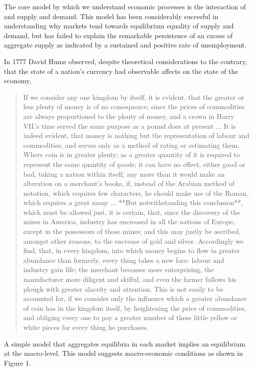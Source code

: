 \documentclass{article}
\begin{document}
The core model by which we understand economic processes is the interaction of and supply and
demand. This model has been considerably succesful in understanding why markets tend towards
equilibrium equality of supply and demand, but has failed to explain the remarkable persistence of
an excess of aggregate supply as indicated by a sustained and positive rate of unemployment.

In 1777 David Hume observed, despite theoretical considerations to the contrary, that the
state of a nation's currency had observable affects on the state of the economy,

\begin{quotation}
If we consider any one kingdom by itself, it is evident, that the greater or less plenty of money
is of no consequence; since the prices of commodities are always proportioned to the plenty of
money, and a crown in Harry VII.’s time served the same purpose as a pound does at present ... It is
indeed evident, that money is nothing but the representation of labour and commodities, and serves
only as a method of rating or estimating them. Where coin is in greater plenty; as a greater
quantity of it is required to represent the same quantity of goods; it can have no effect, either
good or bad, taking a nation within itself; any more than it would make an alteration on a
merchant’s books, if, instead of the Arabian method of notation, which requires few characters, he
should make use of the Roman, which requires a great many ... **But notwithstanding this
conclusion**, which must be allowed just, it is certain, that, since the discovery of the mines in
America, industry has encreased in all the nations of Europe, except in the possessors of those
mines; and this may justly be ascribed, amongst other reasons, to the encrease of gold and silver.
Accordingly we find, that, in every kingdom, into which money begins to flow in greater abundance
than formerly, every thing takes a new face: labour and industry gain life; the merchant becomes
more enterprising, the manufacturer more diligent and skilful, and even the farmer follows his
plough with greater alacrity and attention. This is not easily to be accounted for, if we consider
only the influence which a greater abundance of coin has in the kingdom itself, by heightening the
price of commodities, and obliging every one to pay a greater number of these little yellow or white
pieces for every thing he purchases.
\end{quotation}

A simple model that aggregates equilibria in each market implies an equilibrium at the macro-level.
This model suggests macro-economic conditions as shown in Figure 1.

% 
% 
% 
\end{document}
